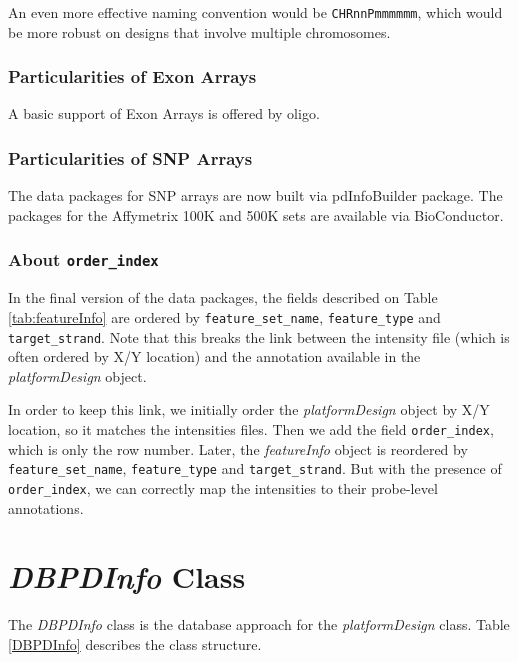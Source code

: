 \documentclass{article}
\newcommand{\Robject}[1]{{\texttt{#1}}}
\newcommand{\Rpackage}[1]{{\textsf{#1}}}
\newcommand{\Rclass}[1]{{\textit{#1}}}
\begin{document}
An even more effective naming convention would be
\Robject{CHRnnPmmmmmm}, which would be more robust on designs that
involve multiple chromosomes.

\subsubsection{Particularities of Exon Arrays}

A basic support of Exon Arrays is offered by \Rpackage{oligo}.

\subsubsection{Particularities of SNP Arrays}

The data packages for SNP arrays are now built via \Rpackage{pdInfoBuilder} package. The packages for the Affymetrix 100K and 500K sets are available via BioConductor.

\subsubsection{About \Robject{order\_index}}

In the final version of the data packages, the fields described on Table
\ref{tab:featureInfo} are ordered by \Robject{feature\_set\_name},
\Robject{feature\_type} and \Robject{target\_strand}. Note that this
breaks the link between the intensity file (which is often ordered by
X/Y location) and the annotation available in the
\Rclass{platformDesign} object.

In order to keep this link, we initially order the
\Rclass{platformDesign} object by X/Y location, so it matches the
intensities files. Then we add the field \Robject{order\_index}, which
is only the row number. Later, the \Rclass{featureInfo} object is
reordered by \Robject{feature\_set\_name}, \Robject{feature\_type} and
\Robject{target\_strand}. But with the presence of
\Robject{order\_index}, we can correctly map the intensities to their
probe-level annotations.

\section{\Rclass{DBPDInfo} Class}

The \Rclass{DBPDInfo} class is the database approach for the \Rclass{platformDesign} class. Table \ref{DBPDInfo} describes the class structure.
\end{document}
